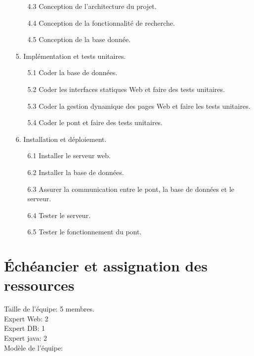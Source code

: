 \documentclass[10pt,a4paper]{report}
\begin{document}
\begin{flushleft}
\begin{enumerate}
\begin{enumerate}
						\item[4.3] Conception de l'architecture du projet.\\
						\item[4.4] Conception de la fonctionnalité de recherche.\\
						\item[4.5] Conception de la base donnée.\\
					\end{enumerate}
				\item[5.] Implémentation et tests unitaires.\\
					\begin{enumerate}
						\item[5.1] Coder la base de données.\\
						\item[5.2] Coder les interfaces statiques Web et faire des tests unitaires.\\
						\item[5.3] Coder la gestion dynamique des pages Web et faire les tests unitaires.\\
						\item[5.4] Coder le pont et faire des tests unitaires.\\
				\end{enumerate}
				\item[6.] Installation et déploiement.\\
					\begin{enumerate}
						\item[6.1] Installer le serveur web.\\
						\item[6.2] Installer la base de données.\\
						\item[6.3] Assurer la communication entre le pont, la base de données et le serveur.\\
						\item[6.4] Tester le serveur.\\
						\item[6.5] Tester le fonctionnement du pont.\\
					\end{enumerate}
				\end{enumerate}
				\section*{Échéancier et assignation des ressources}
						Taille de l'équipe: 5 membres.\\
						Expert Web: 2\\
						Expert DB: 1\\
						Expert java: 2\\
						Modèle de l'équipe: %
				\\

\end{flushleft}
\end{document}
